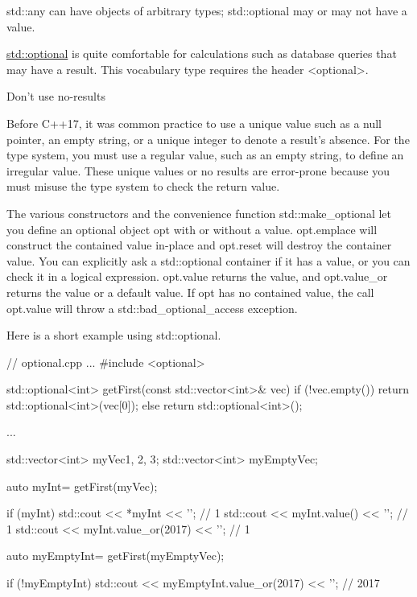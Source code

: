 std::any can have objects of arbitrary types; std::optional may or may not have a value.


\href{http://en.cppreference.com/w/cpp/utility/optional}{std::optional} is quite comfortable for calculations such as database queries that may have a result. This vocabulary type requires the header <optional>.

\begin{myTip}{Don’t use no-results}
	
Before C++17, it was common practice to use a unique value such as a null pointer, an empty string, or a unique integer to denote a result’s absence. For the type system, you must use a regular value, such as an empty string, to define an irregular value. These unique values or no results are error-prone because you must misuse the type system to check the return value.
	
\end{myTip}

The various constructors and the convenience function std::make\_optional let you define an optional object opt with or without a value. opt.emplace will construct the contained value in-place and opt.reset will destroy the container value. You can explicitly ask a std::optional container if it has a value, or you can check it in a logical expression. opt.value returns the value, and opt.value\_or returns the value or a default value. If opt has no contained value, the call opt.value will throw a std::bad\_optional\_access exception.

Here is a short example using std::optional.


\begin{cpp}
// optional.cpp
...
#include <optional>

std::optional<int> getFirst(const std::vector<int>& vec){
	if (!vec.empty()) return std::optional<int>(vec[0]);
	else return std::optional<int>();
}

...

std::vector<int> myVec{1, 2, 3};
std::vector<int> myEmptyVec;

auto myInt= getFirst(myVec);

if (myInt){
	std::cout << *myInt << '\n'; // 1
	std::cout << myInt.value() << '\n'; // 1
	std::cout << myInt.value_or(2017) << '\n'; // 1
}

auto myEmptyInt= getFirst(myEmptyVec);

if (!myEmptyInt){
	std::cout << myEmptyInt.value_or(2017) << '\n'; // 2017
}
\end{cpp}

